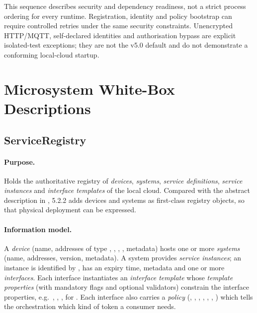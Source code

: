\documentclass[a4paper]{arrowhead}
\begin{document}
This sequence describes security and dependency readiness, not a strict process
ordering for every runtime. Registration, identity and policy bootstrap can require
controlled retries under the same security constraints. Unencrypted HTTP/MQTT,
self-declared identities and authorisation bypass are explicit isolated-test
exceptions; they are not the v5.0 default and do not demonstrate a conforming
local-cloud startup.

\newpage



\def\ArrowheadCoreNetworkDeployment{1}


\newpage
\section{Microsystem White-Box Descriptions}
\label{sec:systems}

\subsection{ServiceRegistry}
\label{sec:sr}

\paragraph{Purpose.} Holds the authoritative registry of \emph{devices}, \emph{systems},
\emph{service definitions}, \emph{service instances} and \emph{interface templates} of the
local cloud. Compared with the abstract description in \cite{gsosd50}, 5.2.2 adds devices and
systems as first-class registry objects, so that physical deployment can be expressed.

\paragraph{Information model.}
A \emph{device} (name, addresses of type , , ,
, metadata) hosts one or more \emph{systems} (name, addresses, version,
metadata). A system provides \emph{service instances}; an instance is identified by
, has an expiry time, metadata and one or
more \emph{interfaces}. Each interface instantiates an \emph{interface template} whose
\emph{template properties} (with mandatory flags and optional validators) constrain the
interface properties, e.g.\ , ,
,  for . Each interface also
carries a \emph{policy} (, , ,
, ,
, )
which tells the orchestration which kind of token a consumer needs.
\end{document}

